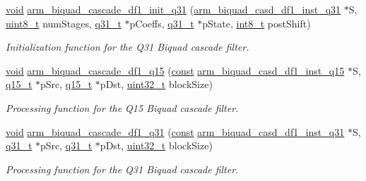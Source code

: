 \begin{DoxyCompactItemize}
\hyperlink{group___n_a_m_e_ga18028b8badbf1ea7e704ccac3c488e82}{void} \hyperlink{group___biquad_cascade_d_f1_gaf42a44f9b16d61e636418c83eefe577b}{arm\-\_\-biquad\-\_\-cascade\-\_\-df1\-\_\-init\-\_\-q31} (\hyperlink{structarm__biquad__casd__df1__inst__q31}{arm\-\_\-biquad\-\_\-casd\-\_\-df1\-\_\-inst\-\_\-q31} $\ast$S, \hyperlink{stdint_8h_aba7bc1797add20fe3efdf37ced1182c5}{uint8\-\_\-t} num\-Stages, \hyperlink{arm__math_8h_adc89a3547f5324b7b3b95adec3806bc0}{q31\-\_\-t} $\ast$p\-Coeffs, \hyperlink{arm__math_8h_adc89a3547f5324b7b3b95adec3806bc0}{q31\-\_\-t} $\ast$p\-State, \hyperlink{stdint_8h_ad566f6541e98b74246db1a3a3a85ad49}{int8\-\_\-t} post\-Shift)
\begin{DoxyCompactList}\small\item\em Initialization function for the Q31 Biquad cascade filter. \end{DoxyCompactList}\item 
\hyperlink{group___n_a_m_e_ga18028b8badbf1ea7e704ccac3c488e82}{void} \hyperlink{group___biquad_cascade_d_f1_gadd66a0aefdc645031d607b0a5b37a942}{arm\-\_\-biquad\-\_\-cascade\-\_\-df1\-\_\-q15} (\hyperlink{group___n_a_m_e_ga7ae6d0e43244213b34de2c2b9aa30da6}{const} \hyperlink{structarm__biquad__casd__df1__inst__q15}{arm\-\_\-biquad\-\_\-casd\-\_\-df1\-\_\-inst\-\_\-q15} $\ast$S, \hyperlink{arm__math_8h_ab5a8fb21a5b3b983d5f54f31614052ea}{q15\-\_\-t} $\ast$p\-Src, \hyperlink{arm__math_8h_ab5a8fb21a5b3b983d5f54f31614052ea}{q15\-\_\-t} $\ast$p\-Dst, \hyperlink{stdint_8h_a435d1572bf3f880d55459d9805097f62}{uint32\-\_\-t} block\-Size)
\begin{DoxyCompactList}\small\item\em Processing function for the Q15 Biquad cascade filter. \end{DoxyCompactList}\item 
\hyperlink{group___n_a_m_e_ga18028b8badbf1ea7e704ccac3c488e82}{void} \hyperlink{group___biquad_cascade_d_f1_ga27b0c54da702713976e5202d20b4473f}{arm\-\_\-biquad\-\_\-cascade\-\_\-df1\-\_\-q31} (\hyperlink{group___n_a_m_e_ga7ae6d0e43244213b34de2c2b9aa30da6}{const} \hyperlink{structarm__biquad__casd__df1__inst__q31}{arm\-\_\-biquad\-\_\-casd\-\_\-df1\-\_\-inst\-\_\-q31} $\ast$S, \hyperlink{arm__math_8h_adc89a3547f5324b7b3b95adec3806bc0}{q31\-\_\-t} $\ast$p\-Src, \hyperlink{arm__math_8h_adc89a3547f5324b7b3b95adec3806bc0}{q31\-\_\-t} $\ast$p\-Dst, \hyperlink{stdint_8h_a435d1572bf3f880d55459d9805097f62}{uint32\-\_\-t} block\-Size)
\begin{DoxyCompactList}\small\item\em Processing function for the Q31 Biquad cascade filter. \end{DoxyCompactList}\end{DoxyCompactItemize}


